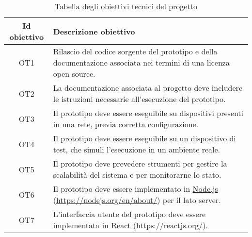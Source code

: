\begin{table}[H]
\caption{Tabella degli obiettivi tecnici del progetto}
\label{tab:obiettivi-tecnici}
\begin{tabularx}{\linewidth}{|c|X|}
\hline
\textbf{Id obiettivo} & \textbf{Descrizione obiettivo} \\
\hline
\label{OT1} OT1 & Rilascio del codice sorgente del prototipo e della documentazione associata nei termini di una licenza \gls{open source}. \\
\hline
\label{OT2} OT2 & La documentazione associata al progetto deve includere le istruzioni necessarie all'esecuzione del prototipo. \\
\hline
\label{OT3} OT3 & Il prototipo deve essere eseguibile su dispositivi presenti in una rete, previa corretta configurazione. \\
\hline
\label{OT4} OT4 & Il prototipo deve essere eseguibile su un dispositivo di test, che simuli l'esecuzione in un ambiente reale. \\
\hline
\label{OT5} OT5 & Il prototipo deve prevedere strumenti per gestire la scalabilità del sistema e per monitorarne lo stato. \\
\hline
\label{OT6} OT6 & Il prototipo deve essere implementato in \href{https://nodejs.org/en/about/}{Node.js} (\url{https://nodejs.org/en/about/}) per il lato server. \\
\hline
\label{OT7} OT7 & L'interfaccia utente del prototipo deve essere implementata in \href{https://reactjs.org/}{React} (\url{https://reactjs.org/}). \\
\hline
\end{tabularx}
\end{table}
